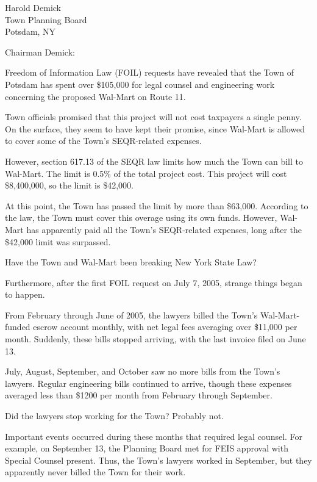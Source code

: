 \documentclass[12pt]{letter}
\begin{document}
\begin{letter}{Harold Demick\\Town Planning Board\\Potsdam, NY}

\address{93 Elm St.\\Potsdam, NY 13676}

\signature{Jason Rohrer}


\opening{Chairman Demick:}

Freedom of Information Law (FOIL) requests have revealed that the Town of Potsdam has spent over \$105,000 for legal counsel and engineering work concerning the proposed Wal-Mart on Route 11.

Town officials promised that this project will not cost taxpayers a single penny.  On the surface, they seem to have kept their promise, since Wal-Mart is allowed to cover some of the Town's SEQR-related expenses.

However, section 617.13 of the SEQR law limits how much the Town can bill to Wal-Mart.  The limit is 0.5\% of the total project cost.  This project will cost \$8,400,000, so the limit is \$42,000.

At this point, the Town has passed the limit by more than \$63,000.  According to the law, the Town must cover this overage using its own funds.  However, Wal-Mart has apparently paid all the Town's SEQR-related expenses, long after the \$42,000 limit was surpassed.  

Have the Town and Wal-Mart been breaking New York State Law?

Furthermore, after the first FOIL request on July 7, 2005, strange things began to happen.

From February through June of 2005, the lawyers billed the Town's Wal-Mart-funded escrow account monthly, with net legal fees averaging over \$11,000 per month.  Suddenly, these bills stopped arriving, with the last invoice filed on June 13.

July, August, September, and October saw no more bills from the Town's lawyers.  Regular engineering bills continued to arrive, though these expenses averaged less than \$1200 per month from February through September.

Did the lawyers stop working for the Town?  Probably not.

Important events occurred during these months that required legal counsel.  For example, on September 13, the Planning Board met for FEIS approval with Special Counsel present.  Thus, the Town's lawyers worked in September, but they apparently never billed the Town for their work.


\end{letter}
\end{document}
